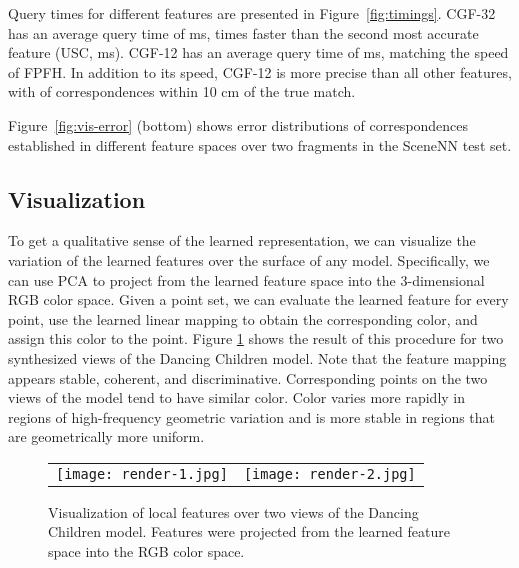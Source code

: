 Query times for different features are presented in Figure~\ref{fig:timings}. CGF-32 has an average query time of  ms,  times faster than the second most accurate feature (USC,  ms). CGF-12 has an average query time of  ms, matching the speed of FPFH. In addition to its speed, \mbox{CGF-12} is more precise than all other features, with  of correspondences within 10 cm of the true match.

\begin{comment}
\begin{figure}[h]
\centering
    \texttt{[image: scenenn-timings.pdf]}
\caption{Query time and precision on the SceneNN test set.}
\label{fig:timing-scenenn}
\end{figure}
\end{comment}

Figure~\ref{fig:vis-error} (bottom) shows error distributions of correspondences established in different feature spaces over two fragments in the SceneNN test set.

\subsection{Visualization}
\label{sec:visualization}
To get a qualitative sense of the learned representation, we can visualize the variation of the learned features over the surface of any model. Specifically, we can use PCA to project from the learned feature space into the \mbox{3-dimensional} RGB color space. Given a point set, we can evaluate the learned feature for every point, use the learned linear mapping to obtain the corresponding color, and assign this color to the point. Figure \ref{fig:dc-vis} shows the result of this procedure for two synthesized views of the Dancing Children model. Note that the feature mapping appears stable, coherent, and discriminative. Corresponding points on the two views of the model tend to have similar color. Color varies more rapidly in regions of high-frequency geometric variation and is more stable in regions that are geometrically more uniform.

\begin{figure}[h]
\centering
\begin{tabular}{c c}
    \texttt{[image: render-1.jpg]} &
    \texttt{[image: render-2.jpg]}
\end{tabular}
\vspace{0.5mm}
\caption{Visualization of local features over two views of the Dancing Children model. Features were projected from the learned feature space into the RGB color space.}
\label{fig:dc-vis}
\end{figure}

